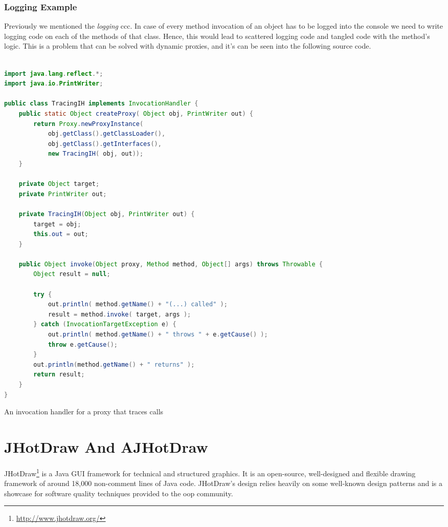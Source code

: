 \subsubsection{Logging Example}
Previously we mentioned the \textit{logging} \ac{ccc}.
In case of every method invocation of an object has to be logged into the console we need to write logging code on each of the methods of that class.
Hence, this would lead to scattered logging code and tangled code with the method's logic.
This is a problem that can be solved with dynamic proxies, and it's can be seen into the following source code.

\begin{sourcecode}
	\begin{lstlisting}[language=Java]

import java.lang.reflect.*;
import java.io.PrintWriter;

public class TracingIH implements InvocationHandler {
    public static Object createProxy( Object obj, PrintWriter out) {
        return Proxy.newProxyInstance(
            obj.getClass().getClassLoader(),
            obj.getClass().getInterfaces(),
            new TracingIH( obj, out));
    }

    private Object target;
    private PrintWriter out;

    private TracingIH(Object obj, PrintWriter out) {
        target = obj;
        this.out = out;
    }

    public Object invoke(Object proxy, Method method, Object[] args) throws Throwable {
        Object result = null;

        try {
            out.println( method.getName() + "(...) called" );
            result = method.invoke( target, args );
        } catch (InvocationTargetException e) {
            out.println( method.getName() + " throws " + e.getCause() );
            throw e.getCause();
        }
        out.println(method.getName() + " returns" );
        return result;
    }
}	

	\end{lstlisting}
	\caption{An invocation handler for a proxy that traces calls \cite{forman2004java}}
\end{sourcecode}


\section{JHotDraw And AJHotDraw}\label{JHotDraw And AJHotDraw}
JHotDraw\footnote{\url{http://www.jhotdraw.org/}} is a Java GUI framework for technical and structured graphics. 
It is an open-source, well-designed and flexible drawing framework of around 18,000 non-comment lines of  Java code. 
JHotDraw's  design relies heavily on some well-known design patterns\cite{gamma1995design} and is a showcase for software quality techniques provided to the \ac{oop} community. 

